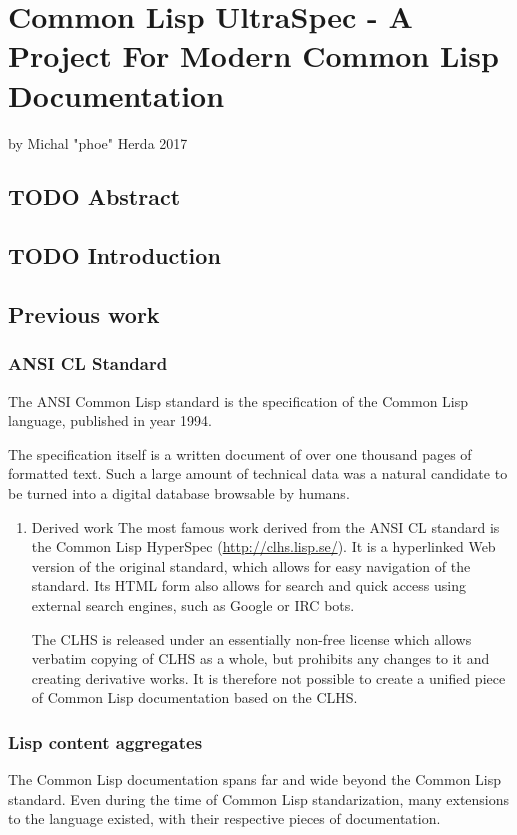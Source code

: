 \documentclass[11pt]{article}
\author{Michał Herda}
\date{\today}
\title{}
\begin{document}
\tableofcontents

\section{Common Lisp UltraSpec - A Project For Modern Common Lisp Documentation}
\label{sec:orga1c7c82}
by Michal "phoe" Herda 2017
\subsection{{\bfseries\sffamily TODO} Abstract}
\label{sec:orgd3952c1}

\subsection{{\bfseries\sffamily TODO} Introduction}
\label{sec:org2817f6a}

\subsection{Previous work}
\label{sec:orgf62c727}
\subsubsection{ANSI CL Standard}
\label{sec:org909c677}
The ANSI Common Lisp standard is the specification of the Common Lisp language, published in year 1994.

The specification itself is a written document of over one thousand pages of formatted text. Such a large amount of technical data was a natural candidate to be turned into a digital database browsable by humans.
\begin{enumerate}
\item Derived work
\label{sec:orgad96279}
The most famous work derived from the ANSI CL standard is the Common Lisp HyperSpec (\url{http://clhs.lisp.se/}). It is a hyperlinked Web version of the original standard, which allows for easy navigation of the standard. Its HTML form also allows for search and quick access using external search engines, such as Google or IRC bots.

The CLHS is released under an essentially non-free license which allows verbatim copying of CLHS as a whole, but prohibits any changes to it and creating derivative works. It is therefore not possible to create a unified piece of Common Lisp documentation based on the CLHS.
\end{enumerate}
\subsubsection{Lisp content aggregates}
\label{sec:orgcc58841}
The Common Lisp documentation spans far and wide beyond the Common Lisp standard. Even during the time of Common Lisp standarization, many extensions to the language existed, with their respective pieces of documentation.
\end{document}
